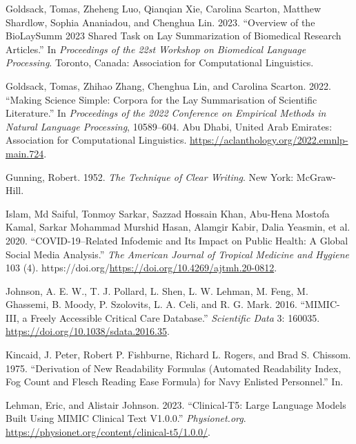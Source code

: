 \documentclass[
]{article}
\newlength{\cslhangindent}
\newlength{\cslentryspacingunit} %
\newenvironment{CSLReferences}[2] %
 {%
  \setlength{\parindent}{0pt}
  \ifodd #1
  \let\oldpar\par
  \def\par{\hangindent=\cslhangindent\oldpar}
  \fi
  \setlength{\parskip}{#2\cslentryspacingunit}
 }%
 {}
\begin{document}
\begin{CSLReferences}{1}{0}
\leavevmode{}%
Goldsack, Tomas, Zheheng Luo, Qianqian Xie, Carolina Scarton, Matthew
Shardlow, Sophia Ananiadou, and Chenghua Lin. 2023. {``Overview of the
BioLaySumm 2023 Shared Task on Lay Summarization of Biomedical Research
Articles.''} In \emph{Proceedings of the 22st Workshop on Biomedical
Language Processing}. Toronto, Canada: Association for Computational
Linguistics.

\leavevmode{}%
Goldsack, Tomas, Zhihao Zhang, Chenghua Lin, and Carolina Scarton. 2022.
{``Making Science Simple: Corpora for the Lay Summarisation of
Scientific Literature.''} In \emph{Proceedings of the 2022 Conference on
Empirical Methods in Natural Language Processing}, 10589--604. Abu
Dhabi, United Arab Emirates: Association for Computational Linguistics.
\url{https://aclanthology.org/2022.emnlp-main.724}.

\leavevmode{}%
Gunning, Robert. 1952. \emph{The Technique of Clear Writing}. New York:
McGraw-Hill.

\leavevmode{}%
Islam, Md Saiful, Tonmoy Sarkar, Sazzad Hossain Khan, Abu-Hena Mostofa
Kamal, Sarkar Mohammad Murshid Hasan, Alamgir Kabir, Dalia Yeasmin, et
al. 2020. {``COVID-19--Related Infodemic and Its Impact on Public
Health: A Global Social Media Analysis.''} \emph{The American Journal of
Tropical Medicine and Hygiene} 103 (4).
https://doi.org/\url{https://doi.org/10.4269/ajtmh.20-0812}.

\leavevmode{}%
Johnson, A. E. W., T. J. Pollard, L. Shen, L. W. Lehman, M. Feng, M.
Ghassemi, B. Moody, P. Szolovits, L. A. Celi, and R. G. Mark. 2016.
{``MIMIC-III, a Freely Accessible Critical Care Database.''}
\emph{Scientific Data} 3: 160035.
\url{https://doi.org/10.1038/sdata.2016.35}.

\leavevmode{}%
Kincaid, J. Peter, Robert P. Fishburne, Richard L. Rogers, and Brad S.
Chissom. 1975. {``Derivation of New Readability Formulas (Automated
Readability Index, Fog Count and Flesch Reading Ease Formula) for Navy
Enlisted Personnel.''} In.

\leavevmode{}%
Lehman, Eric, and Alistair Johnson. 2023. {``Clinical-T5: Large Language
Models Built Using MIMIC Clinical Text V1.0.0.''} \emph{Physionet.org}.
\url{https://physionet.org/content/clinical-t5/1.0.0/}.


\end{CSLReferences}
\end{document}
